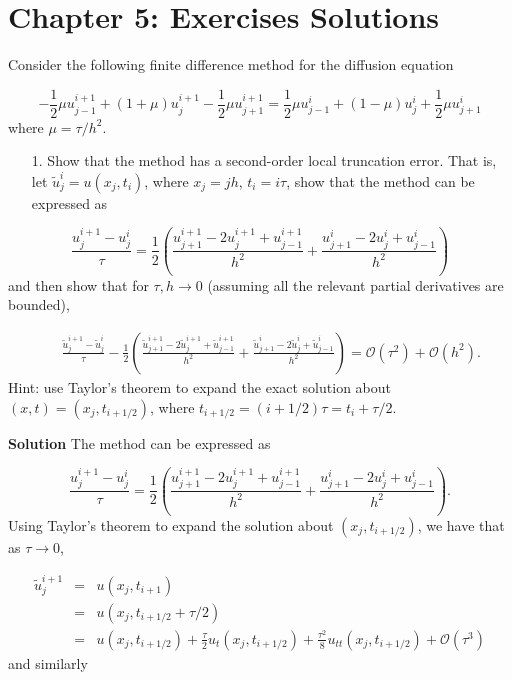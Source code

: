 \documentclass[12pt,a4paper]{article}
\begin{document}
\section{Chapter 5: Exercises Solutions}
Consider the following finite difference method for the diffusion equation

\[
-\frac{1}{2}\mu u^{i+1}_{j-1} + (1 + \mu)u^{i+1}_j -\frac{1}{2}\mu u^{i+1}_{j+1} = 
\frac{1}{2}\mu u^{i}_{j-1} + (1 - \mu)u^{i}_j +\frac{1}{2}\mu u^{i}_{j+1} 
\]
where $\mu = \tau/h^2$.

\begin{itemize}
\item[1. ] Show that the method has a second-order local truncation error. That is, let $\tilde{u}^i_j = u(x_j,t_i)$, where $x_j = jh$, $t_i = i\tau$, show that the method can be expressed as

\end{itemize}
\[
\frac{u^{i+1}_j - u^i_j}{\tau} = \frac{1}{2}\left( \frac{u^{i+1}_{j+1} - 2u^{i+1}_{j} + u^{i+1}_{j-1}}{h^2} + \frac{u^{i}_{j+1} - 2u^{i}_{j} + u^{i}_{j-1}}{h^2}   \right)
\]
and then show that for $\tau, h \to 0$ (assuming all the relevant partial derivatives are bounded),


\begin{eqnarray*}
&& \frac{\tilde{u}^{i+1}_j - \tilde{u}^i_j}{\tau} - \frac{1}{2}\left( \frac{\tilde{u}^{i+1}_{j+1} - 2\tilde{u}^{i+1}_{j} + \tilde{u}^{i+1}_{j-1}}{h^2} + \frac{\tilde{u}^{i}_{j+1} - 2\tilde{u}^{i}_{j} + \tilde{u}^{i}_{j-1}}{h^2}   \right) = \mathcal{O}(\tau^2) + \mathcal{O}(h^2).
\end{eqnarray*}
Hint: use Taylor's theorem to expand the exact solution about $(x,t) = (x_j,t_{i+1/2})$, where $t_{i+1/2} = (i + 1/2)\tau = t_i + \tau/2$.

\textbf{Solution} The method can be expressed as

\[
\frac{u^{i+1}_j - u^i_j}{\tau} = \frac{1}{2}\left( \frac{u^{i+1}_{j+1} - 2u^{i+1}_{j} + u^{i+1}_{j-1}}{h^2} + \frac{u^{i}_{j+1} - 2u^{i}_{j} + u^{i}_{j-1}}{h^2}   \right).
\]
Using Taylor's theorem to expand the solution about $(x_j, t_{i+1/2})$, we have that as $\tau \to 0$,


\begin{eqnarray*}
\tilde{u}^{i+1}_j  &=& u(x_{j},t_{i+1}) \\
                 &=& u(x_j,t_{i+1/2}+\tau/2) \\
                 &=& u(x_j,t_{i+1/2}) + \frac{\tau}{2}u_t(x_j,t_{i+1/2}) + \frac{\tau^2}{8}u_{tt}(x_j,t_{i+1/2}) + \mathcal{O}(\tau^3)
\end{eqnarray*}
and similarly
\end{document}

